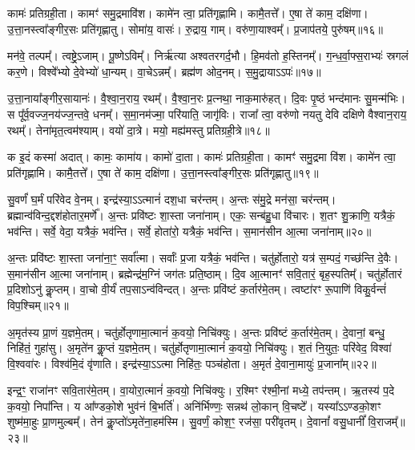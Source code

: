 कामः॑ प्रतिग्रही॒ता। 
कामꣳ॑ समु॒द्रमावि॑श। 
कामे॑न त्वा॒ प्रति॑गृह्णामि। 
कामै॒तत्ते᳚। 
ए॒षा ते॑ काम॒ दक्षि॑णा। 
उ॒त्ता॒नस्त्वा᳚ङ्गीर॒सः प्रति॑गृह्णातु। 
सोमा॑य॒ वासः॑। 
रु॒द्राय॒ गाम्। 
वरु॑णा॒याश्वम्᳚। 
प्र॒जाप॑तये॒ पुरु॑षम्॥१६॥%

मन॑वे॒ तल्पम्᳚। 
त्वष्ट्रे॒ऽजाम्। 
पू॒ष्णेऽविम्᳚। 
निर्\mbox{}ऋ॑त्या अश्वतरगर्द॒भौ। 
हि॒मव॑तो ह॒स्तिनम्᳚। 
ग॒न्ध॒र्वा॒फ्स॒राभ्यः॑ स्रगलं कर॒णे। 
विश्वे᳚भ्यो दे॒वेभ्यो॑ धा॒न्यम्। 
वा॒चेऽन्नम्᳚। 
ब्रह्म॑ण ओद॒नम्। 
स॒मु॒द्रायाऽऽपः॑॥१७॥

उ॒त्ता॒नाया᳚ङ्गीर॒सायानः॑। 
वै॒श्वा॒न॒राय॒ रथम्᳚। 
वै॒श्वा॒न॒रः प्र॒त्नथा॒ नाक॒मारु॑हत्। 
दि॒वः पृ॒ष्ठं भन्द॑मानः सु॒मन्म॑भिः। 
स पू᳚र्व॒वज्ज॒नय॑ज्ज॒न्तवे॒ धनम्᳚। 
स॒मा॒नम॑ज्मा॒ परि॑याति॒ जागृ॑विः। 
राजा᳚ त्वा॒ वरु॑णो नयतु देवि दक्षिणे वैश्वान॒राय॒ रथम्᳚। 
तेना॑मृत॒त्वम॑श्याम्। 
वयो॑ दा॒त्रे। 
मयो॒ मह्य॑मस्तु प्रतिग्रही॒त्रे॥१८॥

क इ॒दं कस्मा॑ अदात्। 
कामः॒ कामा॑य। 
कामो॑ दा॒ता। 
कामः॑ प्रतिग्रही॒ता। 
कामꣳ॑ समु॒द्रमा वि॑श। 
कामे॑न त्वा॒ प्रति॑गृह्णामि। 
कामै॒तत्ते᳚। 
ए॒षा ते॑ काम॒ दक्षि॑णा। 
उ॒त्ता॒नस्त्वा᳚ङ्गीर॒सः प्रति॑गृह्णातु॥१९॥
\anuvakamend[दा॒ता पुरु॑ष॒मपः॑ प्रतिग्रही॒त्रे नव॑ च]

सु॒वर्णं॑ घ॒र्मं परि॑वेद वे॒नम्। 
इन्द्र॑स्या॒ऽऽत्मानं॑ दश॒धा चर॑न्तम्। 
अ॒न्तः स॑मु॒द्रे मन॑सा॒ चर॑न्तम्। 
ब्रह्मान्व॑विन्द॒द्दश॑होतार॒मर्णे᳚। 
अ॒न्तः प्रवि॑ष्टः  शा॒स्ता जना॑नाम्। 
एकः॒ सन्ब॑हु॒धा वि॑चारः। 
श॒तꣳ शु॒क्राणि॒ यत्रैकं॒ भव॑न्ति। 
सर्वे॒ वेदा॒ यत्रैकं॒ भव॑न्ति। 
सर्वे॒ होता॑रो॒ यत्रैकं॒ भव॑न्ति। 
स॒मान॑सीन आ॒त्मा जना॑नाम्॥२०॥%

अ॒न्तः प्रवि॑ष्टः  शा॒स्ता जना॑ना॒ꣳ॒ सर्वा᳚त्मा। 
सर्वाः᳚ प्र॒जा यत्रैकं॒ भव॑न्ति। 
चतु॑र्\mbox{}होतारो॒ यत्र॑ स॒म्पदं॒ गच्छ॑न्ति दे॒वैः। 
स॒मान॑सीन आ॒त्मा जना॑नाम्। 
ब्रह्मेन्द्र॑म॒ग्निं जग॑तः प्रति॒ष्ठाम्। 
दि॒व आ॒त्मानꣳ॑ सवि॒तारं॒ बृह॒स्पतिम्᳚। 
चतु॑र्\mbox{}होतारं प्र॒दिशोऽनु॑ कॢ॒प्तम्। 
वा॒चो वी॒र्यं॑ तप॒साऽन्व॑विन्दत्। 
अ॒न्तः प्रवि॑ष्टं क॒र्तार॑मे॒तम्। 
त्वष्टा॑रꣳ रू॒पाणि॑ विकु॒र्वन्तं॑ विप॒श्चिम्॥२१॥

अ॒मृत॑स्य प्रा॒णं य॒ज्ञमे॒तम्। 
चतु॑र्\mbox{}होतृणामा॒त्मानं॑ क॒वयो॒ निचि॑क्युः। 
अ॒न्तः प्रवि॑ष्टं क॒र्तार॑मे॒तम्। 
दे॒वानां॒ बन्धु॒ निहि॑तं॒ गुहा॑सु। 
अ॒मृते॑न कॢ॒प्तं य॒ज्ञमे॒तम्। 
चतु॑र्\mbox{}होतृणामा॒त्मानं॑ क॒वयो॒ निचि॑क्युः। 
श॒तं नि॒युतः॒ परि॑वेद॒ विश्वा॑ वि॒श्ववा॑रः। 
विश्व॑मि॒दं वृ॑णाति। 
इन्द्र॑स्या॒ऽऽत्मा निहि॑तः॒ पञ्च॑होता। 
अ॒मृतं॑ दे॒वाना॒मायुः॑ प्र॒जाना᳚म्॥२२॥%

इन्द्र॒ꣳ॒ राजा॑नꣳ सवि॒तार॑मे॒तम्। 
वा॒योरा॒त्मानं॑ क॒वयो॒ निचि॑क्युः। 
र॒श्मिꣳ र॑श्मी॒नां मध्ये॒ तप॑न्तम्। 
ऋ॒तस्य॑ प॒दे क॒वयो॒ निपा᳚न्ति। 
य आ᳚ण्डको॒शे भुव॑नं बि॒भर्ति॑। 
अनि॑र्भिण्णः॒ सन्नथ॑ लो॒कान् वि॒चष्टे᳚। 
यस्या᳚ऽऽण्डको॒शꣳ शुष्म॑मा॒हुः प्रा॒णमुल्बम्᳚। 
तेन॑ कॢ॒प्तो॑ऽमृते॑ना॒हम॑स्मि। 
सु॒वर्णं॒ कोश॒ꣳ॒ रज॑सा॒ परी॑वृतम्। 
दे॒वानां᳚ वसु॒धानीं᳚  वि॒राजम्᳚॥२३॥%

